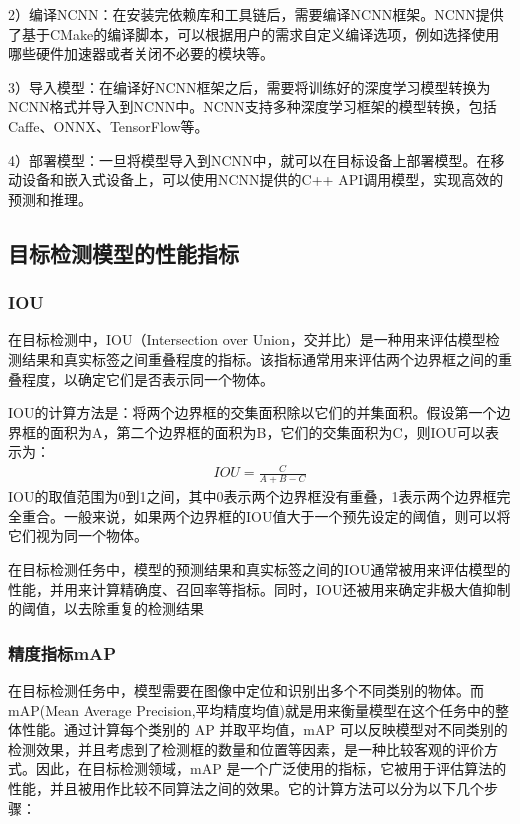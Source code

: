 \documentclass{ctexart}
\numberwithin{equation}{section}%
\numberwithin{figure}{section}%
\numberwithin{table}{section}%
\begin{document}
	2）编译NCNN：在安装完依赖库和工具链后，需要编译NCNN框架。NCNN提供了基于CMake的编译脚本，可以根据用户的需求自定义编译选项，例如选择使用哪些硬件加速器或者关闭不必要的模块等。
	
	3）导入模型：在编译好NCNN框架之后，需要将训练好的深度学习模型转换为NCNN格式并导入到NCNN中。NCNN支持多种深度学习框架的模型转换，包括Caffe、ONNX、TensorFlow等。
	
	4）部署模型：一旦将模型导入到NCNN中，就可以在目标设备上部署模型。在移动设备和嵌入式设备上，可以使用NCNN提供的C++ API调用模型，实现高效的预测和推理。
	
	\subsection{目标检测模型的性能指标}
	\subsubsection{IOU}
	在目标检测中，IOU（Intersection over Union，交并比）是一种用来评估模型检测结果和真实标签之间重叠程度的指标。该指标通常用来评估两个边界框之间的重叠程度，以确定它们是否表示同一个物体。
	
	IOU的计算方法是：将两个边界框的交集面积除以它们的并集面积。假设第一个边界框的面积为A，第二个边界框的面积为B，它们的交集面积为C，则IOU可以表示为：
		\begin{align}
			IOU = \frac{C}{A + B - C}
		\end{align}
	IOU的取值范围为0到1之间，其中0表示两个边界框没有重叠，1表示两个边界框完全重合。一般来说，如果两个边界框的IOU值大于一个预先设定的阈值，则可以将它们视为同一个物体。
	
	在目标检测任务中，模型的预测结果和真实标签之间的IOU通常被用来评估模型的性能，并用来计算精确度、召回率等指标。同时，IOU还被用来确定非极大值抑制的阈值，以去除重复的检测结果
	
	\subsubsection{精度指标mAP}
	在目标检测任务中，模型需要在图像中定位和识别出多个不同类别的物体。而mAP(Mean Average Precision,平均精度均值)就是用来衡量模型在这个任务中的整体性能。通过计算每个类别的 AP 并取平均值，mAP 可以反映模型对不同类别的检测效果，并且考虑到了检测框的数量和位置等因素，是一种比较客观的评价方式。因此，在目标检测领域，mAP 是一个广泛使用的指标，它被用于评估算法的性能，并且被用作比较不同算法之间的效果。它的计算方法可以分为以下几个步骤：
	
%	
%	
	
\end{document}
